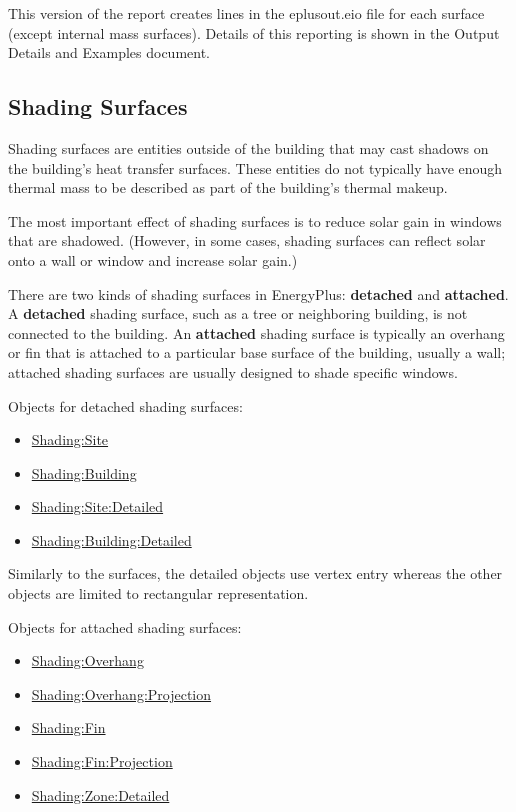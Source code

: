 This version of the report creates lines in the eplusout.eio file for each surface (except internal mass surfaces). Details of this reporting is shown in the Output Details and Examples document.

\subsection{Shading Surfaces}\label{shading-surfaces}

Shading surfaces are entities outside of the building that may cast shadows on the building's heat transfer surfaces. These entities do not typically have enough thermal mass to be described as part of the building's thermal makeup.

The most important effect of shading surfaces is to reduce solar gain in windows that are shadowed. (However, in some cases, shading surfaces can reflect solar onto a wall or window and increase solar gain.)

There are two kinds of shading surfaces in EnergyPlus: \textbf{detached} and \textbf{attached}. A \textbf{detached} shading surface, such as a tree or neighboring building, is not connected to the building. An \textbf{attached} shading surface is typically an overhang or fin that is attached to a particular base surface of the building, usually a wall; attached shading surfaces are usually designed to shade specific windows.

Objects for detached shading surfaces:

\begin{itemize}
\item
  \hyperref[shadingsite-shadingbuilding]{Shading:Site}
\item
  \hyperref[shadingsite-shadingbuilding]{Shading:Building}
\item
  \hyperref[shadingsitedetailed-shadingbuildingdetailed]{Shading:Site:Detailed}
\item
  \hyperref[shadingsitedetailed-shadingbuildingdetailed]{Shading:Building:Detailed}
\end{itemize}

Similarly to the surfaces, the detailed objects use vertex entry whereas the other objects are limited to rectangular representation.

Objects for attached shading surfaces:

\begin{itemize}
\item
  \hyperref[shadingoverhang]{Shading:Overhang}
\item
  \hyperref[shadingoverhangprojection]{Shading:Overhang:Projection}
\item
  \hyperref[shadingfin]{Shading:Fin}
\item
  \hyperref[shadingfinprojection]{Shading:Fin:Projection}
\item
  \hyperref[shadingzonedetailed-000]{Shading:Zone:Detailed}
\end{itemize}

